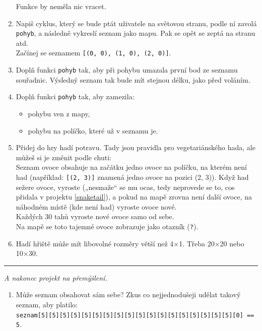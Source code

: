 \documentclass[a4paper,10pt]{article}
\newcommand\startsection[1]{
     \vspace{0.2ex}
    \hrule
    {\fontspec{Oxygen} \tiny
     \vspace{-1ex}
     \emph{#1}
     \vspace{-1.5em}
    }
}
\begin{document}
\begin{enumerate}[resume]
    Funkce by neměla nic vracet.

\item Napiš cyklus, který se bude ptát uživatele na světovou stranu,
    podle ní zavolá \verb+pohyb+, a následně vykreslí seznam jako mapu.
    Pak se opět se zeptá na stranu atd.
    \\Začínej se seznamem \verb+[(0, 0), (1, 0), (2, 0)]+.

\item \label{snaketail}
    Doplň funkci \verb+pohyb+ tak, aby při pohybu umazala první bod ze seznamu
    souřadnic. Výsledný seznam tak bude mít stejnou délku, jako před voláním.

\item Doplň funkci \verb+pohyb+ tak, aby zamezila:
    \begin{itemize}
    \item pohybu ven z mapy,
    \item pohybu na políčko, které už v seznamu je.
    \end{itemize}

\item Přidej do hry hadí potravu. Tady jsou pravidla pro vegetariánského hada,
    ale můžeš si je změnit podle chuti:
    \\ Seznam ovoce obsahuje na začátku jedno ovoce na políčku, na kterém není had
    (například: \texttt{[(2, 3)]} znamená jedno ovoce na pozici (2, 3)).
    Když had sežere ovoce, vyroste („nesmaže“ se mu ocas, tedy neprovede se to,
    cos přidala v projektu \ref{snaketail}),
    a pokud na mapě zrovna není další ovoce, na náhodném místě (kde není had) vyroste ovoce nové.
    \\Každých 30 tahů vyroste nové ovoce samo od sebe.
    \\Na mapě se toto tajemné ovoce zobrazuje jako otazník (\verb+?+).

\item \label{snakeend}
    Hadí hřiště může mít libovolné rozměry větší než 4×1.
    Třeba 20×20 nebo 10×30.

\end{enumerate}

\startsection{A nakonec projekt na přemýšlení.}

\begin{enumerate}[resume]

\item Může seznam obsahovat sám sebe? Zkus co nejjednodušeji udělat takový seznam, aby platilo:
    \\\verb+seznam[5][5][5][5][5][5][5][5][5][5][5][5][5][5][5][5][5][5][0] == 5+.

\end{enumerate}
\end{document}
